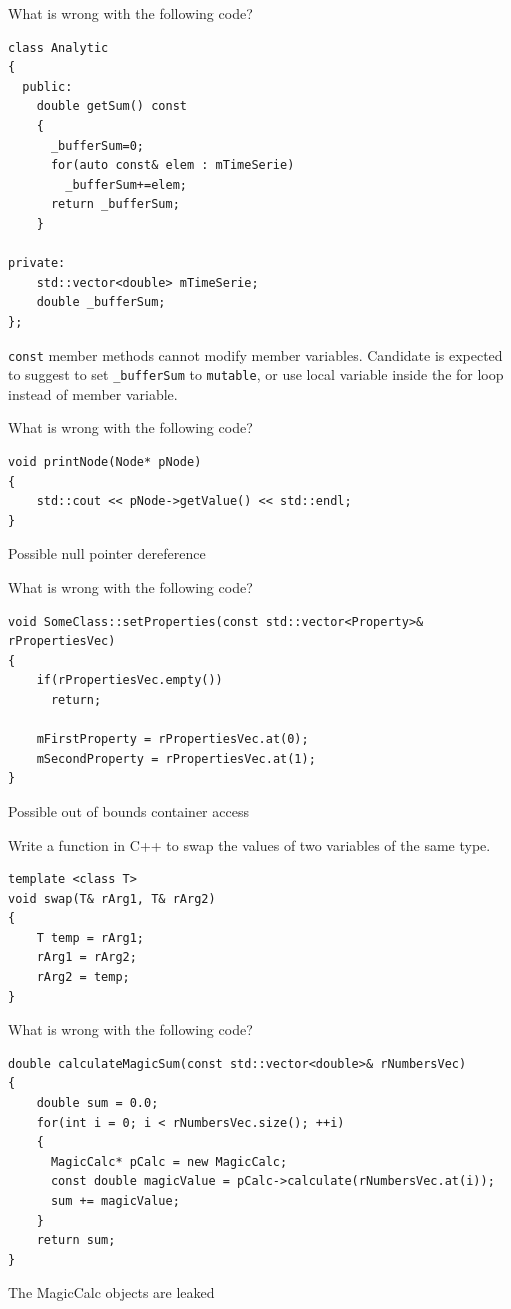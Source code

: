 \documentclass{exam}%
\begin{document}
\begin{questions}
\question What is wrong with the following code?
\begin{lstlisting}
class Analytic
{
  public:
    double getSum() const
    {
      _bufferSum=0;
      for(auto const& elem : mTimeSerie)
        _bufferSum+=elem;
      return _bufferSum;
    }

private:
    std::vector<double> mTimeSerie;
    double _bufferSum;
};

\end{lstlisting}
\begin{solution}[.2in]
\lstinline{const} member methods cannot modify member variables. Candidate is expected to suggest to set \lstinline{_bufferSum} to \lstinline{mutable}, or use local variable inside the for loop instead of member variable.
\end{solution}

\question What is wrong with the following code?
\begin{lstlisting}
void printNode(Node* pNode)
{
    std::cout << pNode->getValue() << std::endl;
}
\end{lstlisting}
\begin{solution}[.2in]
Possible null pointer dereference
\end{solution}

\question What is wrong with the following code?
\begin{lstlisting}
void SomeClass::setProperties(const std::vector<Property>& rPropertiesVec)
{
    if(rPropertiesVec.empty())
      return;

    mFirstProperty = rPropertiesVec.at(0);
    mSecondProperty = rPropertiesVec.at(1);
}
\end{lstlisting}
\begin{solution}[.2in]
Possible out of bounds container access
\end{solution}

\question Write a function in C++ to swap the values of two variables of the same type.
\begin{solution}[.2in]
\begin{lstlisting}
template <class T>
void swap(T& rArg1, T& rArg2)
{
    T temp = rArg1;
    rArg1 = rArg2;
    rArg2 = temp;
}
\end{lstlisting}
\end{solution}

\question What is wrong with the following code?
\begin{lstlisting}
double calculateMagicSum(const std::vector<double>& rNumbersVec)
{
    double sum = 0.0;
    for(int i = 0; i < rNumbersVec.size(); ++i)
    {
      MagicCalc* pCalc = new MagicCalc;
      const double magicValue = pCalc->calculate(rNumbersVec.at(i));
      sum += magicValue;
    }
    return sum;
}
\end{lstlisting}
\begin{solution}[.2in]
The MagicCalc objects are leaked
\end{solution}


\end{questions}
\end{document}

